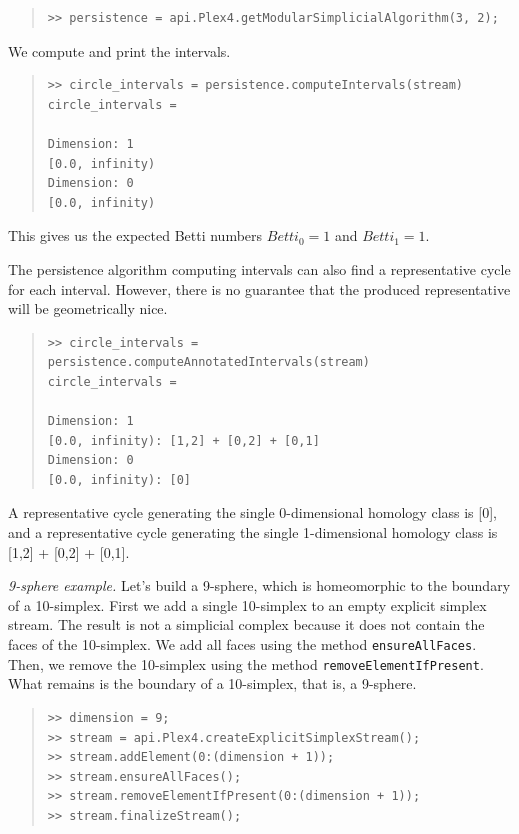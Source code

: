 \documentclass[amscd, amssymb, verbatim]{amsart}[12pt]
\theoremstyle{remark}
\theoremstyle{remark}
\theoremstyle{remark}
\begin{document}
\begin{quote} \begin{verbatim}
>> persistence = api.Plex4.getModularSimplicialAlgorithm(3, 2);
\end{verbatim} \end{quote}

We compute and print the intervals.

\begin{quote} \begin{verbatim}
>> circle_intervals = persistence.computeIntervals(stream)
circle_intervals =

Dimension: 1
[0.0, infinity)
Dimension: 0
[0.0, infinity)
\end{verbatim} \end{quote}

This gives us the expected Betti numbers $Betti_0=1$ and $Betti_1=1$.

The persistence algorithm computing intervals can also find a representative cycle for each interval. However, there is no guarantee that the produced representative will be geometrically nice.

\begin{quote} \begin{verbatim}
>> circle_intervals = persistence.computeAnnotatedIntervals(stream)
circle_intervals =

Dimension: 1
[0.0, infinity): [1,2] + [0,2] + [0,1]
Dimension: 0
[0.0, infinity): [0]
\end{verbatim} \end{quote}

A representative cycle generating the single 0-dimensional homology class is [0], and a representative cycle generating the single 1-dimensional homology class is [1,2] + [0,2] + [0,1].

{\em 9-sphere example.} Let's build a 9-sphere, which is homeomorphic to the boundary of a 10-simplex. First we add a single 10-simplex to an empty explicit simplex stream. The result is not a simplicial complex because it does not contain the faces of the 10-simplex. We add all faces using the method \texttt{ensureAllFaces}. Then, we remove the 10-simplex using the method \texttt{removeElementIfPresent}. What remains is the boundary of a 10-simplex, that is, a 9-sphere.

\begin{quote} \begin{verbatim}
>> dimension = 9;
>> stream = api.Plex4.createExplicitSimplexStream();
>> stream.addElement(0:(dimension + 1));
>> stream.ensureAllFaces();
>> stream.removeElementIfPresent(0:(dimension + 1));
>> stream.finalizeStream();
\end{verbatim} \end{quote}
\end{document}
